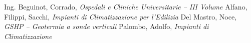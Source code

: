 \begin{thebibliography}{9}
	Ing. Beguinot, Corrado, \emph{Ospedali e Cliniche Universitarie -- III Volume}
	Alfano, Filippi, Sacchi, \emph{Impianti di Climatizzazione per l'Edilizia}
	Del Mastro, Noce, \emph{GSHP -- Geotermia a sonde verticali}
	Palombo, Adolfo, \emph{Impianti di Climatizzazione}
\end{thebibliography}